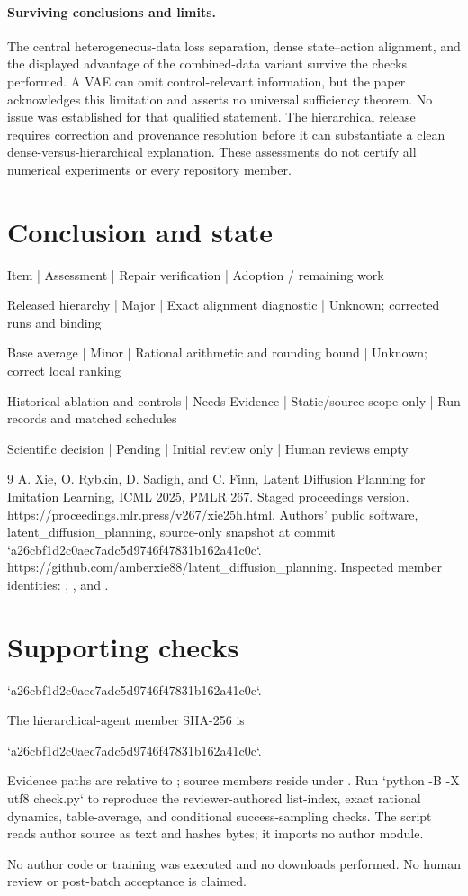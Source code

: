 \documentclass[10pt]{article}
\begin{document}
\paragraph*{Surviving conclusions and limits.}\mbox{}\par
The central heterogeneous-data loss separation, dense state–action alignment, and the displayed advantage of the combined-data variant survive the checks performed. A VAE can omit control-relevant information, but the paper acknowledges this limitation and asserts no universal sufficiency theorem. No issue was established for that qualified statement. The hierarchical release requires correction and provenance resolution before it can substantiate a clean dense-versus-hierarchical explanation. These assessments do not certify all numerical experiments or every repository member.\par
\section*{Conclusion and state}
Item | Assessment | Repair verification | Adoption / remaining work\par
Released hierarchy | Major | Exact alignment diagnostic | Unknown; corrected runs and binding\par
Base average | Minor | Rational arithmetic and rounding bound | Unknown; correct local ranking\par
Historical ablation and controls | Needs Evidence | Static/source scope only | Run records and matched schedules\par
Scientific decision | Pending | Initial review only | Human reviews empty\par
9 A. Xie, O. Rybkin, D. Sadigh, and C. Finn, Latent Diffusion Planning for Imitation Learning, ICML 2025, PMLR 267. Staged proceedings version. https://proceedings.mlr.press/v267/xie25h.html. Authors’ public software, latent\_diffusion\_planning, source-only snapshot at commit `a26cbf1d2c0aec7adc5d9746f47831b162a41c0c`. https://github.com/amberxie88/latent\_diffusion\_planning. Inspected member identities: , , and .\par
\section*{Supporting checks}
`a26cbf1d2c0aec7adc5d9746f47831b162a41c0c`.\par
The hierarchical-agent member SHA-256 is\par
`a26cbf1d2c0aec7adc5d9746f47831b162a41c0c`.\par
Evidence paths are relative to ; source members reside under . Run `python -B -X utf8 check.py` to reproduce the reviewer-authored list-index, exact rational dynamics, table-average, and conditional success-sampling checks. The script reads author source as text and hashes bytes; it imports no author module.\par
No author code or training was executed and no downloads performed. No human review or post-batch acceptance is claimed.\par
\end{document}
